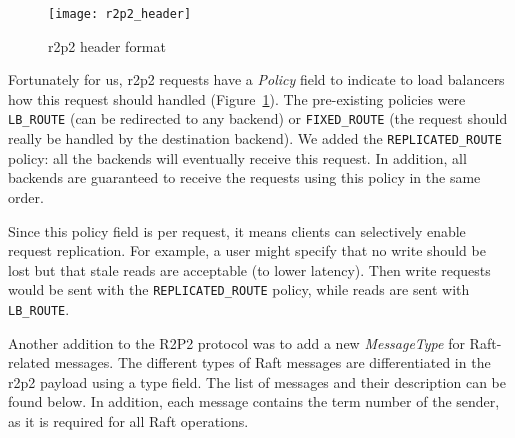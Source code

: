 \begin{figure}[h]
    \centering
    \texttt{[image: r2p2\_header]}
    \caption{\gls{r2p2} header format\cite{r2p2}}
    \label{fig:r2p2-header}
\end{figure}


Fortunately for us, \gls{r2p2} requests have a \emph{Policy} field to indicate to load balancers how this request should handled (Figure~\ref{fig:r2p2-header}).
The pre-existing policies were \texttt{LB\_ROUTE} (can be redirected to any backend) or \texttt{FIXED\_ROUTE} (the request should really be handled by the destination backend).
We added the \texttt{REPLICATED\_ROUTE} policy: all the backends will eventually receive this request.
In addition, all backends are guaranteed to receive the requests using this policy in the same order.

Since this policy field is per request, it means clients can selectively enable request replication.
For example, a user might specify that no write should be lost but that stale reads are acceptable (to lower latency).
Then write requests would be sent with the \texttt{REPLICATED\_ROUTE} policy, while reads are sent with \texttt{LB\_ROUTE}.

Another addition to the R2P2 protocol was to add a new \emph{MessageType} for Raft-related messages.
The different types of Raft messages are differentiated in the \gls{r2p2} payload using a type field.
The list of messages and their description can be found below.
In addition, each message contains the term number of the sender, as it is required for all Raft operations.

